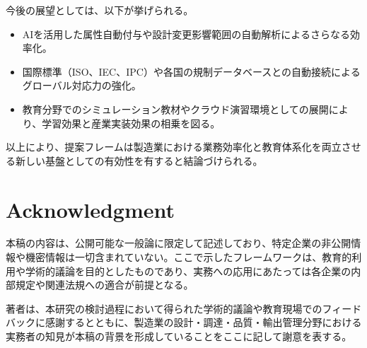 \documentclass[10pt,conference]{IEEEtran}
\begin{document}
今後の展望としては、以下が挙げられる。
\begin{itemize}
  \item AIを活用した属性自動付与や設計変更影響範囲の自動解析によるさらなる効率化。
  \item 国際標準（ISO、IEC、IPC）や各国の規制データベースとの自動接続によるグローバル対応力の強化。
  \item 教育分野でのシミュレーション教材やクラウド演習環境としての展開により、学習効果と産業実装効果の相乗を図る。
\end{itemize}

以上により、提案フレームは製造業における業務効率化と教育体系化を両立させる新しい基盤としての有効性を有すると結論づけられる。

\section*{Acknowledgment}
本稿の内容は、公開可能な一般論に限定して記述しており、特定企業の非公開情報や機密情報は一切含まれていない。ここで示したフレームワークは、教育的利用や学術的議論を目的としたものであり、実務への応用にあたっては各企業の内部規定や関連法規への適合が前提となる。

著者は、本研究の検討過程において得られた学術的議論や教育現場でのフィードバックに感謝するとともに、製造業の設計・調達・品質・輸出管理分野における実務者の知見が本稿の背景を形成していることをここに記して謝意を表する。
\end{document}

